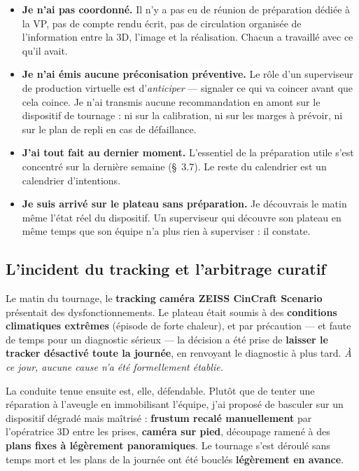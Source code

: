 \documentclass[11pt,a4paper]{report}
\begin{document}
\begin{notebox}[title={Ce que je n'ai pas fait}]
\begin{itemize}
\item \textbf{Je n'ai pas coordonné.} Il n'y a pas eu de réunion de préparation dédiée à la VP,
pas de compte rendu écrit, pas de circulation organisée de l'information entre la 3D,
l'image et la réalisation. Chacun a travaillé avec ce qu'il avait.
\item \textbf{Je n'ai émis aucune préconisation préventive.} Le r\^ole d'un superviseur de
production virtuelle est d'\emph{anticiper} --- signaler ce qui va coincer avant que cela coince.
Je n'ai transmis aucune recommandation en amont sur le dispositif de tournage : ni sur la
calibration, ni sur les marges à prévoir, ni sur le plan de repli en cas de défaillance.
\item \textbf{J'ai tout fait au dernier moment.} L'essentiel de la préparation utile s'est concentré
sur la dernière semaine (§~3.7). Le reste du calendrier est un calendrier d'intentions.
\item \textbf{Je suis arrivé sur le plateau sans préparation.} Je découvrais le matin même l'état
réel du dispositif. Un superviseur qui découvre son plateau en même temps que son équipe n'a
plus rien à superviser : il constate.
\end{itemize}
\end{notebox}

\subsection{L'incident du tracking et l'arbitrage curatif}
Le matin du tournage, le \textbf{tracking caméra ZEISS CinCraft Scenario} présentait des
dysfonctionnements. Le plateau était soumis à des \textbf{conditions climatiques extrêmes}
(épisode de forte chaleur), et par précaution --- et faute de temps pour un diagnostic sérieux ---
la décision a été prise de \textbf{laisser le tracker désactivé toute la journée}, en renvoyant le
diagnostic à plus tard. \emph{À ce jour, aucune cause n'a été formellement établie.}

La conduite tenue ensuite est, elle, défendable. Plutôt que de tenter une réparation à l'aveugle
en immobilisant l'équipe, j'ai proposé de basculer sur un dispositif dégradé mais maîtrisé :
\textbf{frustum recalé manuellement} par l'opératrice 3D entre les prises, \textbf{caméra sur
pied}, découpage ramené à des \textbf{plans fixes à légèrement panoramiques}. Le tournage
s'est déroulé sans temps mort et les plans de la journée ont été bouclés \textbf{légèrement en
avance}.
\end{document}
